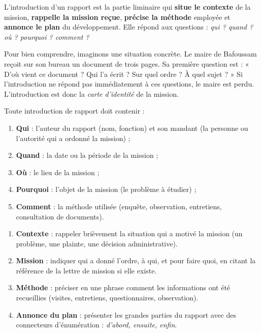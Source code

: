 \documentclass[11pt]{article}
\newcommand{\cle}[1]{{\popxbold\color{popdark}#1}}
\begin{document}
\begin{definition}
L'\cle{introduction} d'un rapport est la partie liminaire qui \textbf{situe le contexte} de la mission, \textbf{rappelle la mission reçue}, \textbf{précise la méthode} employée et \textbf{annonce le plan} du développement. Elle répond aux questions : \emph{qui ? quand ? où ? pourquoi ? comment ?}
\end{definition}

Pour bien comprendre, imaginons une situation concrète. Le maire de Bafoussam reçoit sur son bureau un document de trois pages. Sa première question est : « D'où vient ce document ? Qui l'a écrit ? Sur quel ordre ? À quel sujet ? » Si l'introduction ne répond pas immédiatement à ces questions, le maire est perdu. L'introduction est donc la \emph{carte d'identité} de la mission.

\begin{propriete}
Toute introduction de rapport doit contenir :
\begin{enumerate}
\item \textbf{Qui} : l'auteur du rapport (nom, fonction) et son \cle{mandant} (la personne ou l'autorité qui a ordonné la mission) ;
\item \textbf{Quand} : la date ou la période de la mission ;
\item \textbf{Où} : le lieu de la mission ;
\item \textbf{Pourquoi} : l'objet de la mission (le problème à étudier) ;
\item \textbf{Comment} : la méthode utilisée (enquête, observation, entretiens, consultation de documents).
\end{enumerate}
\end{propriete}

\begin{methode}
\begin{enumerate}
\item \textbf{Contexte} : rappeler brièvement la situation qui a motivé la mission (un problème, une plainte, une décision administrative).
\item \textbf{Mission} : indiquer qui a donné l'ordre, à qui, et pour faire quoi, en citant la référence de la lettre de mission si elle existe.
\item \textbf{Méthode} : préciser en une phrase comment les informations ont été recueillies (visites, entretiens, questionnaires, observation).
\item \textbf{Annonce du plan} : présenter les grandes parties du rapport avec des connecteurs d'énumération : \emph{d'abord, ensuite, enfin}.
\end{enumerate}
\end{methode}
\end{document}
